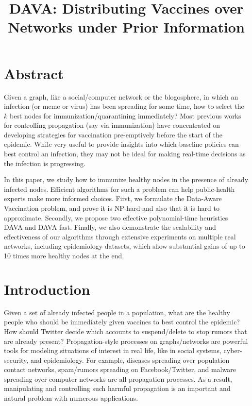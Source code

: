 \documentclass{article}
\title{
    DAVA: Distributing Vaccines over Networks under Prior Information
}
\begin{document}
\maketitle

\section*{Abstract}

Given a graph, like a social/computer network or the blogosphere, in which an infection (or meme or virus) has been spreading for some time, how to select the $k$ best nodes for immunization/quarantining immediately? Most previous works for controlling propagation (say via immunization) have concentrated on developing strategies for vaccination pre-emptively before the start of the epidemic. While very useful to provide insights into which baseline policies can best control an infection, they may not be ideal for making real-time decisions as the infection is progressing.

In this paper, we study how to immunize healthy nodes in the presence of already infected nodes. Efficient algorithms for such a problem can help public-health experts make more informed choices. First, we formulate the Data-Aware Vaccination problem, and prove it is NP-hard and also that it is hard to approximate. Secondly, we propose two effective polynomial-time heuristics DAVA and DAVA-fast. Finally, we also demonstrate the scalability and effectiveness of our algorithms through extensive experiments on multiple real networks, including epidemiology datasets, which show substantial gains of up to 10 times more healthy nodes at the end.

\section{Introduction}

Given a set of already infected people in a population, what are the healthy people who should be immediately given vaccines to best control the epidemic? How should Twitter decide which accounts to suspend/delete to stop rumors that are already present? Propagation-style processes on graphs/networks are powerful tools for modeling situations of interest in real life, like in social systems, cyber-security, and epidemiology. For example, diseases spreading over population contact networks, spam/rumors spreading on Facebook/Twitter, and malware spreading over computer networks are all propagation processes. As a result, manipulating and controlling such harmful propagation is an important and natural problem with numerous applications.
\end{document}
